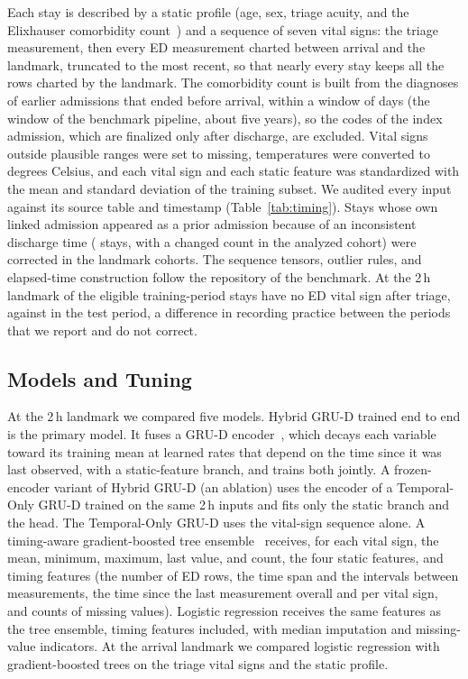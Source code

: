 Each stay is described by a static profile (age, sex, triage acuity, and the Elixhauser comorbidity count~\cite{quan2005coding}) and a sequence of
seven vital signs: the triage measurement, then every ED measurement charted between arrival and the landmark, truncated to the
\RVTEdHtwo{} most recent, so that nearly every stay keeps all the rows charted by the landmark. The comorbidity count is built from the diagnoses of earlier admissions that ended before arrival, within a window of \RVElixWindowDays{} days (the window of the benchmark pipeline, about five years), so the codes of the index admission, which are finalized only after discharge\cite{ramadan2025icdleakage}, are excluded. Vital signs outside plausible ranges were set to missing, temperatures were converted to degrees Celsius, and each vital sign and each static feature was standardized with the mean and standard deviation of the training subset. We audited every input against its source table and
timestamp (Table~\ref{tab:timing}). Stays whose own linked admission appeared as a prior admission because of an inconsistent discharge
time (\RVOwnAdmissionStays{} stays, \RVOwnAdmissionCohortChanged{} with a changed count in the analyzed cohort) were corrected in the landmark cohorts. The
sequence tensors, outlier rules, and elapsed-time construction follow the repository of the benchmark. At the 2\,h landmark \RVZeroRowsTrainPct{} of the
eligible training-period stays have no ED vital sign after triage, against \RVZeroRowsTestPct{} in the test period, a difference in recording practice
between the periods that we report and do not correct.



\subsection{Models and Tuning}
\label{sec:methods-models}

At the 2\,h landmark we compared five models. Hybrid GRU-D trained end to end is the primary model. It fuses a GRU-D encoder~\cite{che2018grud}, which decays each variable toward its training mean at learned rates that depend on the time since it was last observed, with a
static-feature branch, and trains both jointly. A frozen-encoder variant of Hybrid GRU-D (an ablation) uses the encoder of a Temporal-Only GRU-D trained on
the same 2\,h inputs and fits only the static branch and the head. The Temporal-Only GRU-D uses the vital-sign sequence alone. A timing-aware gradient-boosted
tree ensemble~\cite{chen2016xgboost} receives, for each vital sign, the mean, minimum, maximum, last value, and count, the four static features, and
timing features (the number of ED rows, the time span and the intervals between measurements, the time since the last measurement overall and per vital sign,
and counts of missing values). Logistic regression receives the same features as the tree ensemble, timing features included, with median imputation and missing-value indicators. At the arrival
landmark we compared logistic regression with gradient-boosted trees on the triage vital signs and the static profile.

